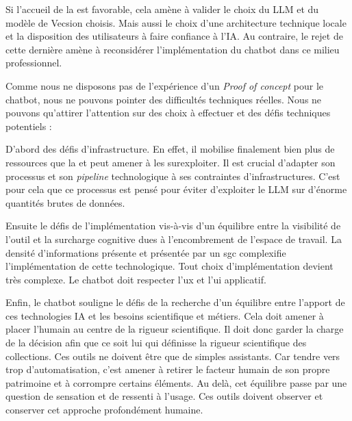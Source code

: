 Si l'accueil de la  est favorable, cela amène à valider le choix du \gls{LLM} et du modèle de \gls{Vecsion} choisis. Mais aussi le choix d'une architecture technique locale et la disposition des utilisateurs à faire confiance à l'\gls{IA}. Au contraire, le rejet de cette dernière amène à reconsidérer l'implémentation du \gls{chatbot} dans ce milieu professionnel.

Comme nous ne disposons pas de l'expérience d'un \textit{Proof of concept} pour le \gls{chatbot}, nous ne pouvons pointer des difficultés techniques réelles. Nous ne pouvons qu'attirer l'attention sur des choix à effectuer et des défis techniques potentiels :

D'abord des défis d'infrastructure. En effet, il mobilise finalement bien plus de ressources que la  et peut amener à les surexploiter. Il est crucial d'adapter son processus et son \textit{pipeline} technologique à ses contraintes d'infrastructures. C'est pour cela que ce processus est pensé pour éviter d'exploiter le \gls{LLM} sur d'énorme quantités brutes de données. 

Ensuite le défis de l'implémentation vis-à-vis d'un équilibre entre la visibilité de l'outil et la surcharge cognitive dues à l'encombrement de l'espace de travail. La densité d'informations présente et présentée par un \gls{sgc} complexifie l'implémentation de cette technologique. Tout choix d'implémentation devient très complexe. Le \gls{chatbot} doit respecter l'\gls{ux} et l'\gls{ui} applicatif. 
	
Enfin, le \gls{chatbot} souligne le défis de la recherche d'un équilibre entre l’apport de ces technologies \gls{IA} et les besoins scientifique et métiers. Cela doit amener à placer l'humain au centre de la rigueur scientifique. Il doit donc garder la charge de la décision afin que ce soit lui qui définisse la rigueur scientifique des collections. Ces outils ne doivent être que de simples assistants. Car tendre vers trop d'automatisation, c'est amener à retirer le facteur humain de son propre patrimoine et à corrompre certains éléments. Au delà, cet équilibre passe par une question de sensation et de ressenti à l'usage. Ces outils doivent observer et conserver cet approche profondément humaine.